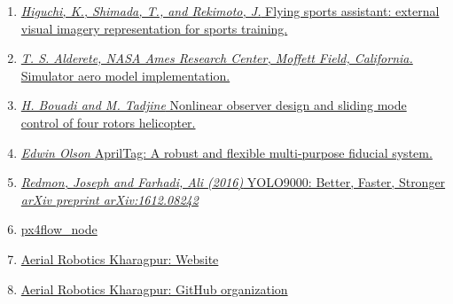 \documentclass[12pt]{article}
\begin{document}
\begin{enumerate}
    \item \href{https://www.researchgate.net/publication/220947254_Flying_sports_assistant_External_visual_imagery_representation_for_sports_training}{\textit{Higuchi, K., Shimada, T., and Rekimoto, J.} Flying sports assistant: external visual imagery representation for sports training.}
    \item \href{http://www.aviationsystemsdivision.arc.nasa.gov/publications/hitl/rtsim/Toms.pdf}{\textit{T. S. Alderete, NASA Ames Research Center, Moffett Field, California.} Simulator aero model implementation.}
    \item \href{https://www.researchgate.net/publication/228962656_Nonlinear_observer_design_and_sliding_mode_control_of_four_rotor_helicopter}{ \textit{ H. Bouadi and M. Tadjine} Nonlinear observer design and sliding mode control of four rotors helicopter.}
    \item \href{https://april.eecs.umich.edu/papers/details.php?name=olson2010tags}{\textit{Edwin Olson} AprilTag: A robust and flexible multi-purpose fiducial system.}
    \item \href{https://pjreddie.com/darknet/yolo/}{\textit{Redmon, Joseph and Farhadi, Ali (2016)} YOLO9000: Better, Faster, Stronger \textit{arXiv preprint arXiv:1612.08242}}
    \item \href{http://wiki.ros.org/px4flow_node}{px4flow\_node}
    \item \href{http://quadrotor-iitkgp.github.io/}{Aerial Robotics Kharagpur: Website}
    \item \href{https://github.com/quadrotor-IITKgp}{ Aerial Robotics Kharagpur: GitHub organization}

\end{enumerate}
\end{document}

